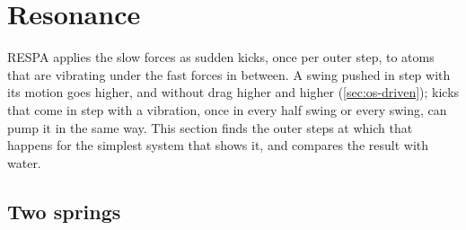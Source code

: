 \section{Resonance}
\label{sec:cs-resonance}

RESPA applies the slow forces as sudden kicks, once per outer step, to
atoms that are vibrating under the fast forces in between. A swing pushed
in step with its motion goes higher, and without drag higher and higher
(\cref{sec:os-driven}); kicks that come in step with a vibration, once in
every half swing or every swing, can pump it in the same way. This section
finds the outer steps at which that happens for the simplest system that
shows it, and compares the result with water.

\subsection*{Two springs}

